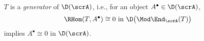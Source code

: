 \item[$3.$] $T$ is a {\it generator} of $\D(\scrA)$, i.e., for an object $A^{\bullet}\in \D(\scrA)$, \[\RHom(T,A^{\bullet})\cong0$ in $\D\big(\Mod\End_{\scrA}(T)\big)\] implies $A^{\bullet}\cong0$ in $\D(\scrA)$.
